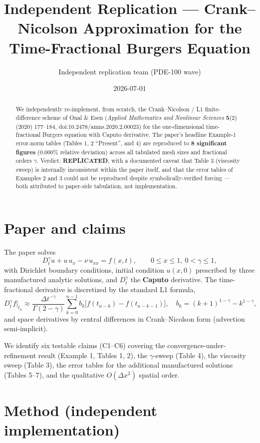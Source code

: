 \documentclass[11pt]{article}
\title{Independent Replication --- Crank--Nicolson Approximation for the Time-Fractional Burgers Equation}
\author{Independent replication team (PDE-100 wave)}
\date{2026-07-01}
\begin{document}
\maketitle

\begin{abstract}
We independently re-implement, from scratch, the Crank--Nicolson / L1 finite-difference scheme
of Onal \& Esen (\emph{Applied Mathematics and Nonlinear Sciences} \textbf{5}(2) (2020) 177--184,
doi:10.2478/amns.2020.2.00023) for the one-dimensional time-fractional Burgers equation with
Caputo derivative. The paper's headline Example-1 error-norm tables (Tables 1, 2 ``Present'',
and 4) are reproduced to \textbf{8 significant figures} (0.000\% relative deviation) across all
tabulated mesh sizes and fractional orders $\gamma$. Verdict: \textbf{REPLICATED}, with a
documented caveat that Table 3 (viscosity sweep) is internally inconsistent within the paper
itself, and that the error tables of Examples 2 and 3 could not be reproduced despite
symbolically-verified forcing --- both attributed to paper-side tabulation, not implementation.
\end{abstract}

\section{Paper and claims}

The paper solves
\[
D_t^{\gamma} u + u\,u_x - \nu\,u_{xx} = f(x,t), \qquad 0 \le x \le 1,\ 0 < \gamma \le 1,
\]
with Dirichlet boundary conditions, initial condition $u(x,0)$ prescribed by three manufactured
analytic solutions, and $D_t^{\gamma}$ the \textbf{Caputo} derivative. The time-fractional
derivative is discretized by the standard L1 formula,
\[
D_t^{\gamma} f \big|_{t_n} \approx
\frac{\Delta t^{-\gamma}}{\Gamma(2-\gamma)}
\sum_{k=0}^{n-1} b_k\bigl[f(t_{n-k}) - f(t_{n-k-1})\bigr],
\quad b_k = (k{+}1)^{1-\gamma} - k^{1-\gamma},
\]
and space derivatives by central differences in Crank--Nicolson form (advection semi-implicit).

We identify six testable claims (C1--C6) covering the convergence-under-refinement result
(Example 1, Tables 1, 2), the $\gamma$-sweep (Table 4), the viscosity sweep (Table 3), the
error tables for the additional manufactured solutions (Tables 5--7), and the qualitative
$O(\Delta x^2)$ spatial order.

\section{Method (independent implementation)}
\end{document}
